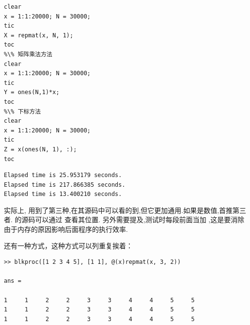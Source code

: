 \vspace{-0.8cm}
\begin{lstlisting}[caption = 用向量重复构造矩阵]
%\% repmat 函数防法
clear
x = 1:1:20000; N = 30000;
tic
X = repmat(x, N, 1);
toc
%\% 矩阵乘法方法
clear
x = 1:1:20000; N = 30000;
tic
Y = ones(N,1)*x;
toc
%\% 下标方法
clear
x = 1:1:20000; N = 30000;
tic
Z = x(ones(N, 1), :);
toc
\end{lstlisting}

\vspace{-0.8cm}
\begin{lstlisting}
Elapsed time is 25.953179 seconds.
Elapsed time is 217.866385 seconds.
Elapsed time is 13.400210 seconds.
\end{lstlisting}

实际上,  用到了第三种,在其源码中可以看的到,但它更加通用.如果是数值,首推第三者.
  的源码可以通过  查看其位置. 另外需要提及,测试时每段前面当加 ,这是要消除由于内存的原因影响后面程序的执行效率.\par

还有一种方式，这种方式可以列重复挨着：

\vspace{-0.4cm}
\begin{lstlisting}
>> blkproc([1 2 3 4 5], [1 1], @(x)repmat(x, 3, 2))

ans =

1     1     2     2     3     3     4     4     5     5
1     1     2     2     3     3     4     4     5     5
1     1     2     2     3     3     4     4     5     5 
\end{lstlisting}

